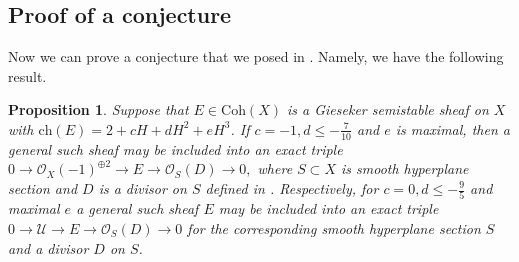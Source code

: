 \documentclass{amsart}
\newtheorem{proposition}[theorem]{Proposition}
\begin{document}
\subsection{Proof of a conjecture}\label{conjecture} Now we can prove a conjecture that we posed in \cite[Conjecture 4.5]{Vass}. Namely, we have the following result.

\begin{proposition}\label{conj proof}Suppose that $E\in\mathrm{Coh}(X)$ is a Gieseker semistable sheaf on $X$ with $\mathrm{ch}(E)=2+cH+dH^2+eH^3$. If $c=-1, d\le-\frac{7}{10}$ and $e$ is maximal, then a general such sheaf may be included into an exact triple $0\to\mathcal O_X(-1)^{\oplus 2}\to E\to\mathcal O_S(D)\to 0,$ where $S\subset X$ is smooth hyperplane section and $D$ is a divisor on $S$ defined in \cite[Proposition 4.4]{Vass}. Respectively, for $c=0, d\le-\frac 95$ and maximal $e$ a general such sheaf $E$ may be included into an exact triple $0\to\mathcal U\to E\to\mathcal O_S(D)\to 0$ for the corresponding smooth hyperplane section $S$ and a divisor $D$ on $S$.
\end{proposition}
\end{document}
